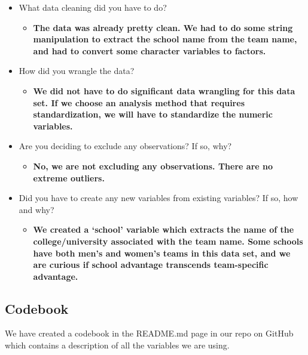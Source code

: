 \documentclass[
  letterpaper,
  DIV=11,
  numbers=noendperiod]{scrartcl}
\providecommand{\tightlist}{%
  \setlength{\itemsep}{0pt}\setlength{\parskip}{0pt}}\usepackage{longtable,booktabs,array}
\begin{document}
\begin{itemize}
\item
  What data cleaning did you have to do?

  \begin{itemize}
  \tightlist
  \item
    \textbf{The data was already pretty clean. We had to do some string
    manipulation to extract the school name from the team name, and had
    to convert some character variables to factors.}
  \end{itemize}
\item
  How did you wrangle the data?

  \begin{itemize}
  \tightlist
  \item
    \textbf{We did not have to do significant data wrangling for this
    data set. If we choose an analysis method that requires
    standardization, we will have to standardize the numeric variables.}
  \end{itemize}
\item
  Are you deciding to exclude any observations? If so, why?

  \begin{itemize}
  \tightlist
  \item
    \textbf{No, we are not excluding any observations. There are no
    extreme outliers.}
  \end{itemize}
\item
  Did you have to create any new variables from existing variables? If
  so, how and why?

  \begin{itemize}
  \tightlist
  \item
    \textbf{We created a `school' variable which extracts the name of
    the college/university associated with the team name. Some schools
    have both men's and women's teams in this data set, and we are
    curious if school advantage transcends team-specific advantage.}
  \end{itemize}
\end{itemize}

\subsection{Codebook}\label{codebook}

We have created a codebook in the README.md page in our repo on GitHub
which contains a description of all the variables we are using.
\end{document}
